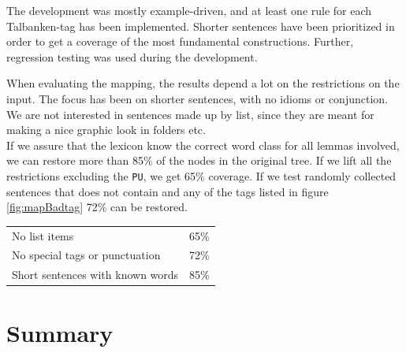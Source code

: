 \documentclass{report}
\begin{document}
The development was mostly example-driven, and at least one rule for each
Talbanken-tag has been implemented.
Shorter sentences have been prioritized in order to get a coverage of the most
fundamental constructions. Further,  
regression testing was used during the development. %

When evaluating the mapping, the results depend a lot on the restrictions on the
input. 
The focus has been on shorter sentences, with no idioms or conjunction. We are
not interested in sentences made up by list, since they are meant for making
a nice graphic look in folders etc.\\


If we
assure that the lexicon know the correct word class for all lemmas involved, we
can restore more than 85\% of the nodes in the original tree.
If we lift all the restrictions excluding the \verb|PU|, we get
65\% coverage.
If we test randomly collected sentences that does not contain and any of the tags listed
in figure \ref{fig:mapBadtag} 72\% can be restored. \\

\begin{tabular}{ll}
No list items & 65\%\\
No special tags or punctuation & 72\%\\
Short sentences with known words & 85\%\\
\end{tabular}




\chapter{Summary}
\end{document}
